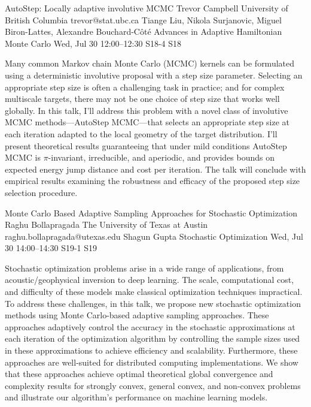 \begin{talk}
  {AutoStep: Locally adaptive involutive MCMC}%
  {Trevor Campbell}%
  {University of British Columbia}%
  {trevor@stat.ubc.ca}%
  {Tiange Liu, Nikola Surjanovic, Miguel Biron-Lattes, Alexandre Bouchard-C\^ot\'e}%
  {Advances in Adaptive Hamiltonian Monte Carlo}%
  {Wed, Jul 30 12:00--12:30}%
  {S18-4}%
  {S18}%
    

\medskip

Many common Markov chain Monte Carlo (MCMC) kernels can be formulated using a deterministic involutive proposal with a step size parameter.  Selecting an appropriate step size is often a challenging task in practice; and for complex multiscale targets, there may not be one choice of step size that works well globally.  In this talk, I'll address this problem with a novel class of involutive MCMC methods---AutoStep MCMC---that selects an appropriate step size at each iteration adapted to the local geometry of the target distribution.  I'll present theoretical results guaranteeing that under mild conditions AutoStep MCMC is $\pi$-invariant, irreducible, and aperiodic, and provides bounds on expected energy jump distance and cost per iteration. The talk will conclude with empirical results examining the robustness and efficacy of the proposed step size selection procedure.

\end{talk}

\begin{talk}
  {Monte Carlo Based Adaptive Sampling Approaches for Stochastic Optimization}%
  {Raghu Bollapragada}%
  {The University of Texas at Austin}%
  {raghu.bollapragada@utexas.edu}%
  {Shagun Gupta}%
  {Stochastic Optimization}%
  {Wed, Jul 30 14:00--14:30}%
  {S19-1}%
  {S19}%
    
   
Stochastic optimization problems arise in a wide range of applications, from acoustic/geophysical inversion to deep learning. The scale, computational cost, and difficulty of these models make classical optimization techniques impractical. To address these challenges, in this talk, we propose new stochastic optimization methods using Monte Carlo-based adaptive sampling approaches. These approaches adaptively control the accuracy in the stochastic approximations at each iteration of the optimization algorithm by controlling the sample sizes used in these approximations to achieve efficiency and scalability. Furthermore, these approaches are well-suited for distributed computing implementations. We show that these approaches achieve optimal theoretical global convergence and complexity results for strongly convex, general convex, and non-convex problems and illustrate our algorithm's performance on machine learning models.

\medskip

\end{talk}


